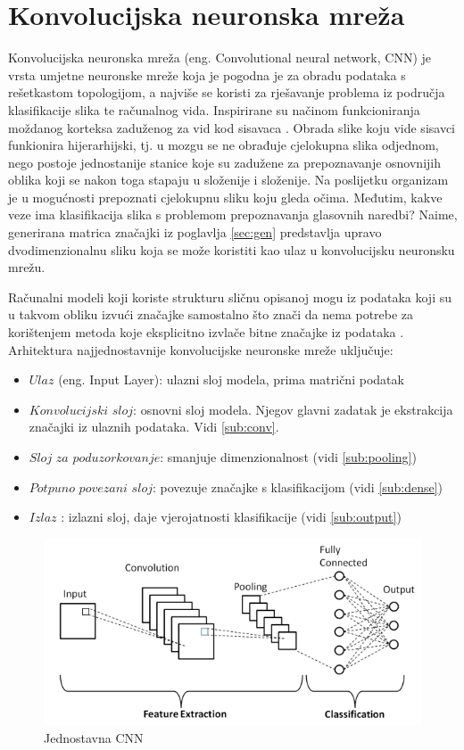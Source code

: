 \section{Konvolucijska neuronska mreža}
\label{sec:cnn}

Konvolucijska neuronska mreža (eng. Convolutional neural network, CNN) je vrsta 
umjetne neuronske mreže koja je pogodna je za obradu podataka s rešetkastom
topologijom, a najviše se koristi za rješavanje problema iz područja klasifikacije slika
te računalnog vida. Inspirirane su načinom funkcioniranja moždanog korteksa 
zaduženog za vid kod sisavaca \cite{pycodemates}. Obrada slike koju vide sisavci
funkionira hijerarhijski, tj. u mozgu se ne obrađuje cjelokupna slika odjednom,
nego postoje jednostanije stanice koje su zadužene za prepoznavanje osnovnijih
oblika koji se nakon toga stapaju u složenije i složenije. Na poslijetku 
organizam je u mogućnosti prepoznati cjelokupnu sliku koju gleda očima.
Međutim, kakve veze ima klasifikacija slika s problemom prepoznavanja glasovnih naredbi?
Naime, generirana matrica značajki iz poglavlja \ref{sec:gen} predstavlja upravo dvodimenzionalnu
sliku koja se može koristiti kao ulaz u konvolucijsku neuronsku mrežu. 

Računalni modeli koji koriste strukturu sličnu opisanoj mogu iz
podataka koji su u takvom obliku izvući značajke samostalno što znači da nema
potrebe za korištenjem metoda koje eksplicitno izvlače bitne značajke iz podataka
\cite{1}. Arhitektura najjednostavnije konvolucijske neuronske mreže
uključuje:

\begin{itemize}
    \item \(Ulaz\) (eng. Input Layer): ulazni sloj modela, prima matrični podatak
    \item \(Konvolucijski\) \(sloj\): osnovni sloj modela. Njegov glavni zadatak
          je ekstrakcija značajki iz ulaznih podataka. Vidi \ref{sub:conv}.
    \item \(Sloj\) \(za\) \(poduzorkovanje\): smanjuje dimenzionalnost (vidi \ref{sub:pooling})
    \item \(Potpuno\) \(povezani\) \(sloj\): povezuje značajke s klasifikacijom (vidi \ref{sub:dense})
    \item \(Izlaz\) : izlazni sloj, daje vjerojatnosti klasifikacije (vidi \ref{sub:output})
\end{itemize}

\begin{figure}[htb]
    \centering
    \includegraphics[width=0.5\linewidth]{Chapters/neuronska_mreza/CNN/cnn.png} 
    \caption{Jednostavna CNN \cite{1}}
    \label{pic:cnn}
\end{figure}

